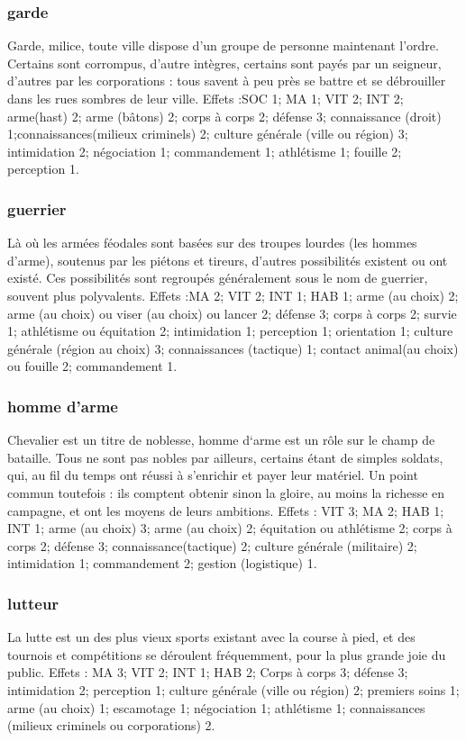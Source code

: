 \documentclass[10pt,a4paper,twocolumn]{book}
\begin{document}
\subsubsection{garde}
Garde, milice, toute ville dispose d’un groupe de personne maintenant l’ordre. Certains sont corrompus, d’autre intègres, certains sont payés par un seigneur, d’autres par les corporations : tous savent à peu près se battre et se débrouiller dans les rues sombres de leur ville.
Effets :SOC 1; MA 1; VIT 2; INT 2; arme(hast) 2; arme (bâtons) 2; corps à corps 2; défense 3; connaissance (droit) 1;connaissances(milieux criminels) 2; culture générale (ville ou région) 3; intimidation 2; négociation 1; commandement 1; athlétisme 1; fouille 2; perception 1.
\subsubsection{guerrier}
Là où les armées féodales sont basées sur des troupes lourdes (les hommes d’arme), soutenus par les piétons et tireurs, d’autres possibilités existent ou ont existé. Ces possibilités sont regroupés généralement sous le nom de guerrier, souvent plus polyvalents.
Effets :MA 2; VIT 2; INT 1; HAB 1; arme (au choix) 2; arme (au choix) ou viser (au choix) ou lancer 2; défense 3; corps à corps 2; survie 1; athlétisme ou équitation 2; intimidation 1; perception 1; orientation 1; culture générale (région au choix) 3; connaissances (tactique) 1; contact animal(au choix) ou fouille 2; commandement 1. 
\subsubsection{homme d’arme}
Chevalier est un titre de noblesse, homme d‘arme est un rôle sur le champ de bataille. Tous ne sont pas nobles par ailleurs, certains étant de simples soldats, qui, au fil du temps ont réussi à s’enrichir et payer leur matériel. Un point commun toutefois : ils comptent obtenir sinon la gloire, au moins la richesse en campagne, et ont les moyens de leurs ambitions.
Effets : VIT 3; MA 2; HAB 1; INT 1; arme (au choix) 3; arme (au choix) 2; équitation ou athlétisme 2; corps à corps 2; défense 3; connaissance(tactique) 2; culture générale (militaire) 2; intimidation 1; commandement 2; gestion (logistique) 1.
\subsubsection{lutteur}
La lutte est un des plus vieux sports existant avec la course à pied, et des tournois et compétitions se déroulent fréquemment, pour la plus grande joie du public.
Effets : MA 3; VIT 2; INT 1; HAB 2; Corps à corps 3; défense 3; intimidation 2; perception 1; culture générale (ville ou région) 2; premiers soins 1; arme (au choix) 1; escamotage 1; négociation 1; athlétisme 1; connaissances (milieux criminels ou corporations) 2.
\end{document}
